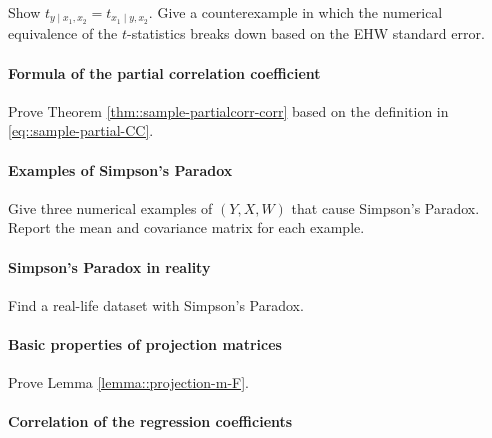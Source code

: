 Show $t_{y\mid x_1, x_2} = t_{x_1\mid y, x_2} $. Give a counterexample in which the numerical equivalence of the $t$-statistics breaks down based on the EHW standard error. 

 








\paragraph{Formula of the partial correlation coefficient}\label{hw7::sample-partial-correlation}

Prove Theorem \ref{thm::sample-partialcorr-corr} based on the definition in \eqref{eq::sample-partial-CC}. 



\paragraph{Examples of Simpson's Paradox}

Give three numerical examples of $(Y,X,W)$ that cause Simpson's Paradox. Report the mean and covariance matrix for each example. 


\paragraph{Simpson's Paradox in reality}

Find a real-life dataset with Simpson's Paradox. 


\paragraph{Basic properties of projection matrices}\label{problem07::projection-matrices}
 
Prove Lemma \ref{lemma::projection-m-F}. 





\paragraph{Correlation of the regression coefficients}\label{hw::7:corr-reg-coef}



